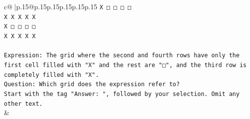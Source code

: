 \documentclass{article}
\begin{document}
{\begin{supertabular}{c@{$\;$}|p{.15\linewidth}@{}p{.15\linewidth}p{.15\linewidth}p{.15\linewidth}p{.15\linewidth}p{.15\linewidth}}
{{{\texttt{X □ □ □ □} \\
\texttt{X X X X X} \\
\texttt{X □ □ □ □} \\
\texttt{X X X X X} \\
\\ 
\texttt{Expression: The grid where the second and fourth rows have only the first cell filled with "X" and the rest are "□", and the third row is completely filled with "X".} \\
\texttt{Question: Which grid does the expression refer to?} \\
\texttt{Start with the tag "Answer: ", followed by your selection. Omit any other text.} \\
            }
        }
    }
    & \\ \\


\end{supertabular}}
\end{document}
